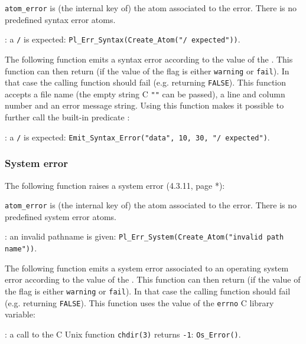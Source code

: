 
\texttt{atom\_error} is (the internal key of) the atom associated to the
error. There is no predefined syntax error atoms. 

: a \texttt{/} is expected:
\texttt{Pl\_Err\_Syntax(Create\_Atom("/ expected"))}.

The following function emits a syntax error according to the value of the
  . This
function can then return (if the value of the flag is either
\texttt{warning} or \texttt{fail}). In that case the calling function should
fail (e.g. returning \texttt{FALSE}). This function accepts a file name (the
empty string C \texttt{""} can be passed), a line and column number and an
error message string. Using this function makes it possible to further call
the built-in predicate 
:


: a \texttt{/} is expected:
\texttt{Emit\_Syntax\_Error("data", 10, 30, "/ expected")}.

\subsubsection{System error}
The following function raises a system error (4.3.11, page *):


\texttt{atom\_error} is (the internal key of) the atom associated to the
error. There is no predefined system error atoms. 

: an invalid pathname is given:
\texttt{Pl\_Err\_System(Create\_Atom("invalid path name"))}.

The following function emits a system error associated to an operating
system error according to the value of the 
 . This function can then return (if the value of the flag is either \texttt{warning} or \texttt{fail}).
In that case the calling function should fail (e.g. returning
\texttt{FALSE}). This function uses the value of the \texttt{errno} C
library variable:


: a call to the C Unix function \texttt{chdir(3)} returns
\texttt{-1}: \texttt{Os\_Error()}.

